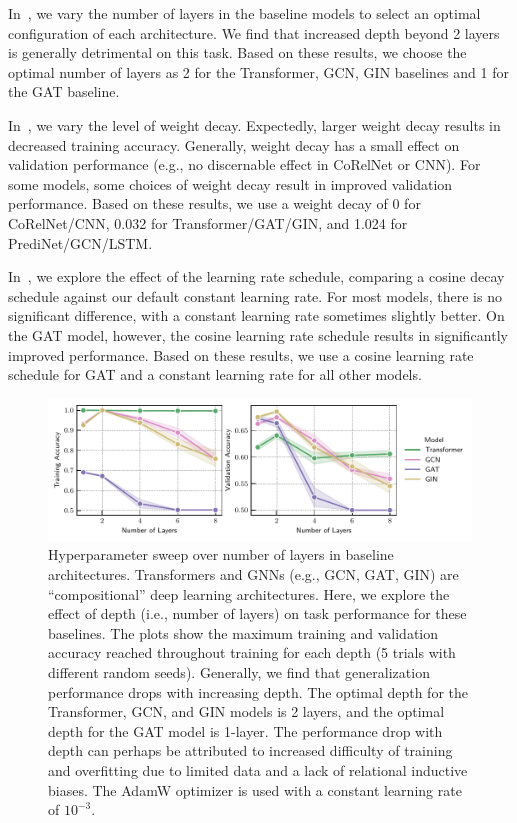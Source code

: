 In~, we vary the number of layers in the baseline models to select an optimal configuration of each architecture. We find that increased depth beyond 2 layers is generally detrimental on this task. Based on these results, we choose the optimal number of layers as 2 for the Transformer, GCN, GIN baselines and 1 for the GAT baseline.

In~, we vary the level of weight decay. Expectedly, larger weight decay results in decreased training accuracy. Generally, weight decay has a small effect on validation performance (e.g., no discernable effect in CoRelNet or CNN). For some models, some choices of weight decay result in improved validation performance. Based on these results, we use a weight decay of 0 for CoRelNet/CNN, 0.032 for Transformer/GAT/GIN, and 1.024 for PrediNet/GCN/LSTM.

In~, we explore the effect of the learning rate schedule, comparing a cosine decay schedule against our default constant learning rate. For most models, there is no significant difference, with a constant learning rate sometimes slightly better. On the GAT model, however, the cosine learning rate schedule results in significantly improved performance. Based on these results, we use a cosine learning rate schedule for GAT and a constant learning rate for all other models.

\begin{figure}[H]
    \includegraphics{figs/experiments/contains_set_n_layers_exploration_adamw-lr_none-trainval.pdf}
    \caption{Hyperparameter sweep over number of layers in baseline architectures. Transformers and GNNs (e.g., GCN, GAT, GIN) are ``compositional'' deep learning architectures. Here, we explore the effect of depth (i.e., number of layers) on task performance for these baselines. The plots show the maximum training and validation accuracy reached throughout training for each depth (5 trials with different random seeds). Generally, we find that generalization performance drops with increasing depth. The optimal depth for the Transformer, GCN, and GIN models is 2 layers, and the optimal depth for the GAT model is 1-layer. The performance drop with depth can perhaps be attributed to increased difficulty of training and overfitting due to limited data and a lack of relational inductive biases. The AdamW optimizer is used with a constant learning rate of $10^{-3}$.}\label{fig:hyperparameter_sweep_nlayers}
\end{figure}

